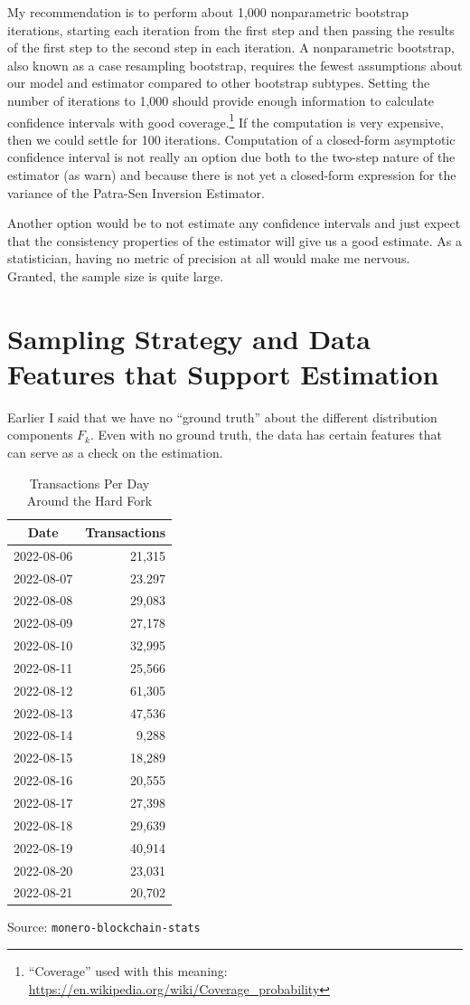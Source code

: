 \documentclass[english]{article}
\providecommand{\tabularnewline}{\\}
\begin{document}
My recommendation is to perform about 1,000 nonparametric bootstrap
iterations, starting each iteration from the first step and then passing
the results of the first step to the second step in each iteration.
A nonparametric bootstrap, also known as a case resampling bootstrap,
requires the fewest assumptions about our model and estimator compared
to other bootstrap subtypes. Setting the number of iterations to 1,000
should provide enough information to calculate confidence intervals
with good coverage.\footnote{``Coverage'' used with this meaning: \href{https://en.wikipedia.org/wiki/Coverage_probability}{https://en.wikipedia.org/wiki/Coverage\_probability}}
If the computation is very expensive, then we could settle for 100
iterations. Computation of a closed-form asymptotic confidence interval
is not really an option due both to the two-step nature of the estimator
(as \cite{Murphy1985} warn) and because there is not yet a closed-form
expression for the variance of the Patra-Sen Inversion Estimator.

Another option would be to not estimate any confidence intervals and
just expect that the consistency properties of the estimator will
give us a good estimate. As a statistician, having no metric of precision
at all would make me nervous. Granted, the sample size is quite large.

\section{Sampling Strategy and Data Features that Support Estimation\label{sec:Sampling-Strategy}}

Earlier I said that we have no ``ground truth'' about the different
distribution components $F_{k}$. Even with no ground truth, the data
has certain features that can serve as a check on the estimation.

\begin{table}%
\caption{Transactions Per Day Around the Hard Fork}

\label{wrap:table-hard-for-tx-volume}

\begin{tabular}{|c|r|}
\hline 
Date & Transactions\tabularnewline
\hline 
\hline 
2022-08-06 & 21,315\tabularnewline
\hline 
2022-08-07 & 23.297\tabularnewline
\hline 
2022-08-08 & 29,083\tabularnewline
\hline 
2022-08-09 & 27,178\tabularnewline
\hline 
2022-08-10 & 32,995\tabularnewline
\hline 
2022-08-11 & 25,566\tabularnewline
\hline 
2022-08-12 & 61,305\tabularnewline
\hline 
2022-08-13 & 47,536\tabularnewline
\hline 
2022-08-14 & 9,288\tabularnewline
\hline 
2022-08-15 & 18,289\tabularnewline
\hline 
2022-08-16 & 20,555\tabularnewline
\hline 
2022-08-17 & 27,398\tabularnewline
\hline 
2022-08-18 & 29,639\tabularnewline
\hline 
2022-08-19 & 40,914\tabularnewline
\hline 
2022-08-20 & 23,031\tabularnewline
\hline 
2022-08-21 & 20,702\tabularnewline
\hline 
\end{tabular}

Source: \texttt{monero-blockchain-stats}\end{table}%
\end{document}

